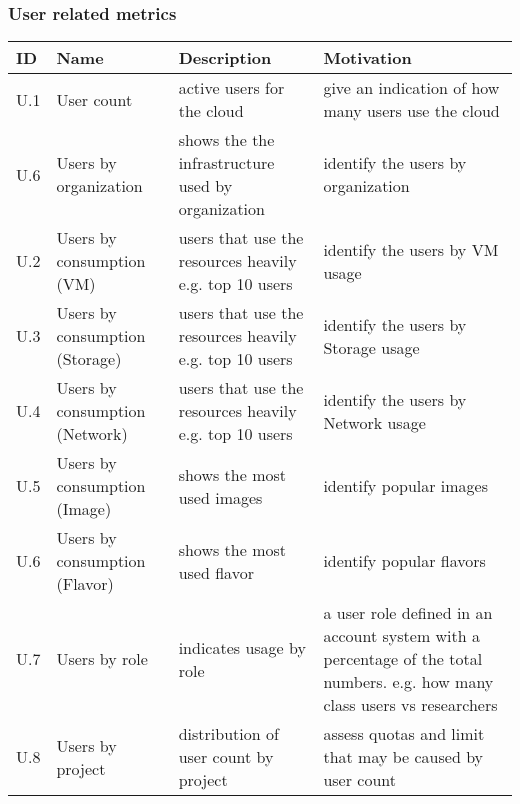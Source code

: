\documentclass{beamer}
\newcommand{\eTABLE}{\end{tabular}
\end{center}
\end{scriptsize}
}
\newcommand{\bTABLE}[2]{
\frametitle{#1}
\bigskip
\begin{scriptsize}
\begin{center}
\begin{tabular}{lp{0.15\textwidth}p{0.3\textwidth}p{0.4\textwidth}}
\hline
\rowcolor{blue!20} \bf ID & \bf Name & \bf Description & \bf Motivation \\
\hline}
\newenvironment{METRICTABLE}[2] {\bTABLE{#1}{#2}}{\eTABLE}
\begin{document}
\begin{frame}[shrink]
\begin{METRICTABLE}{User related metrics}{T:metrics-bigtable}
U.1 & User count                                     &  active users for the cloud                                           & give an indication of how many users use the cloud \\ \hline
U.6 & Users by organization                   & shows the the infrastructure used by organization      & identify the users by organization  \\  \hline
U.2 & Users by consumption (VM)           & users that use the resources heavily e.g. top 10 users & identify the users by VM usage \\  \hline
U.3 & Users by consumption (Storage)    & users that use the resources heavily e.g. top 10 users & identify the users by Storage usage\\  \hline
U.4 & Users by consumption (Network)  & users that use the resources heavily e.g. top 10 users & identify the users by Network usage \\  \hline
U.5 & Users by consumption (Image)      & shows the most used images    & identify popular images  \\  \hline
U.6 & Users by consumption (Flavor)      & shows the most used flavor      & identify popular flavors  \\  \hline
U.7 & Users by role                                 & indicates usage by role             &  a user role defined in an account system with a percentage of the total numbers. e.g. how many class users vs researchers \\ \hline
U.8 & Users by project                            & distribution of user count by project                   & assess quotas and limit that may be caused by user count \\ \hline
\end{METRICTABLE}
\end{frame}
\end{document}
